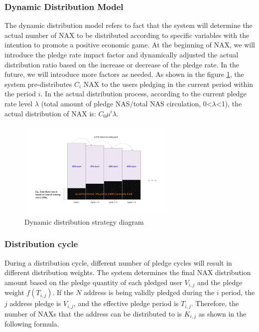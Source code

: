 \subsubsection{Dynamic Distribution Model}
The dynamic distribution model refers to fact that the system will determine the actual number of NAX to be distributed according to specific variables with the intention to promote a positive economic game. At the beginning of NAX, we will introduce the pledge rate impact factor and dynamically adjusted the actual distribution ratio based on the increase or decrease of the pledge rate. In the future, we will introduce more  factors as needed. As shown in the figure \ref{fig:dynamic_dist}, the system pre-distributes $C_i$ NAX to the users pledging in the current period within the period $i$. In the actual distribution process, according to the current pledge rate level $\lambda$ (total amount of pledge NAS/total NAS circulation, 0<$\lambda$<1), the actual distribution of NAX is: $C_0 \mu ^i\lambda$.

\begin{figure}[htbp]
  \centering
  \includegraphics[width=0.68\textwidth]{../common/dynamic_dist.pdf}
  \caption{Dynamic distribution strategy diagram\label{fig:dynamic_dist}}
\end{figure}

\subsubsection{Distribution cycle}
During a distribution cycle, different number of pledge cycles will result in different distribution weights. The system determines the final NAX distribution amount based on the pledge quantity of each pledged user $V_{i, j}$ and the pledge weight \(f(T_{i, j})\). If the $N$ address is being validly pledged during the $i$ period, the $j$ address pledge is $V_{i,j}$, and the effective pledge period is $T_{i,j}$. Therefore, the number of NAXs that the address can be distributed to is $K_{i,j}$ as shown in the following formula.

